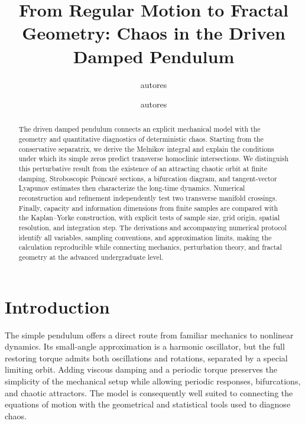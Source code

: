 \documentclass[aps,prb,reprint,floatfix]{revtex4-2}
\begin{document}
\title{From Regular Motion to Fractal Geometry: Chaos in the Driven Damped Pendulum}



\author{autores}
\author{autores}

\begin{abstract}
The driven damped pendulum connects an explicit mechanical model with the geometry and quantitative diagnostics of deterministic chaos. Starting from the conservative separatrix, we derive the Melnikov integral and explain the conditions under which its simple zeros predict transverse homoclinic intersections. We distinguish this perturbative result from the existence of an attracting chaotic orbit at finite damping. Stroboscopic Poincar\'e sections, a bifurcation diagram, and tangent-vector Lyapunov estimates then characterize the long-time dynamics. Numerical reconstruction and refinement independently test two transverse manifold crossings. Finally, capacity and information dimensions from finite samples are compared with the Kaplan--Yorke construction, with explicit tests of sample size, grid origin, spatial resolution, and integration step. The derivations and accompanying numerical protocol identify all variables, sampling conventions, and approximation limits, making the calculation reproducible while connecting mechanics, perturbation theory, and fractal geometry at the advanced undergraduate level.
\end{abstract}

\maketitle

\section{Introduction}
\label{sec:introduction}

The simple pendulum offers a direct route from familiar mechanics to nonlinear dynamics. Its small-angle approximation is a harmonic oscillator, but the full restoring torque admits both oscillations and rotations, separated by a special limiting orbit. Adding viscous damping and a periodic torque preserves the simplicity of the mechanical setup while allowing periodic responses, bifurcations, and chaotic attractors. The model is consequently well suited to connecting the equations of motion with the geometrical and statistical tools used to diagnose chaos.\cite{DeJong1992,BakerGollub1996,Strogatz2015}
\end{document}
